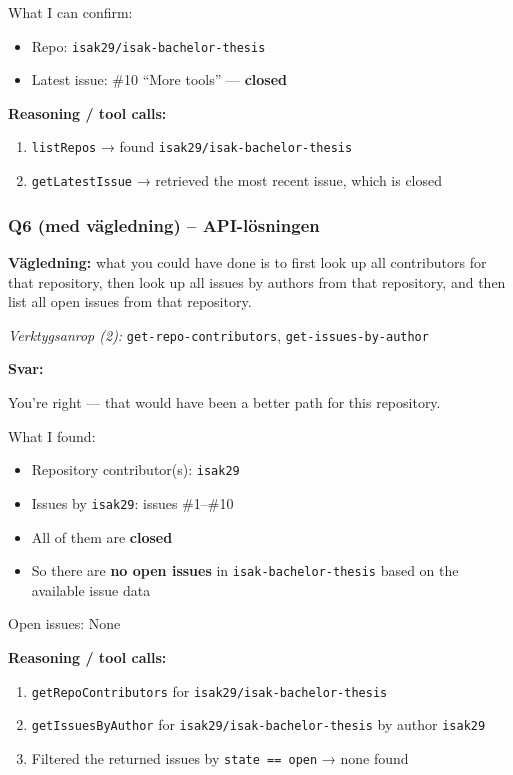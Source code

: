 What I can confirm:
\begin{itemize}
    \item Repo: \texttt{isak29/isak-bachelor-thesis}
    \item Latest issue: \#10 ``More tools'' --- \textbf{closed}
\end{itemize}

\textbf{Reasoning / tool calls:}
\begin{enumerate}
    \item \texttt{listRepos} → found \texttt{isak29/isak-bachelor-thesis}
    \item \texttt{getLatestIssue} → retrieved the most recent issue, which is closed
\end{enumerate}

\clearpage
\subsubsection*{Q6 (med vägledning) -- API-lösningen}\label{fig:api_q6_guided}

\textbf{Vägledning:} what you could have done is to first look up all contributors for that repository, then look up all issues by authors from that repository, and then list all open issues from that repository.

\medskip
\textit{Verktygsanrop (2):} \texttt{get-repo-contributors}, \texttt{get-issues-by-author}

\medskip
\textbf{Svar:}

You're right --- that would have been a better path for this repository.

What I found:
\begin{itemize}
    \item Repository contributor(s): \texttt{isak29}
    \item Issues by \texttt{isak29}: issues \#1--\#10
    \item All of them are \textbf{closed}
    \item So there are \textbf{no open issues} in \texttt{isak-bachelor-thesis} based on the available issue data
\end{itemize}

Open issues: None

\textbf{Reasoning / tool calls:}
\begin{enumerate}
    \item \texttt{getRepoContributors} for \texttt{isak29/isak-bachelor-thesis}
    \item \texttt{getIssuesByAuthor} for \texttt{isak29/isak-bachelor-thesis} by author \texttt{isak29}
    \item Filtered the returned issues by \texttt{state == open} → none found
\end{enumerate}

